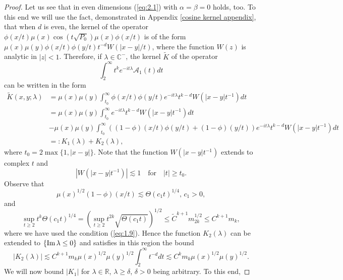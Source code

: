 \documentclass[11pt]{amsart}
\numberwithin{equation}{section}
\def\R{{\mathbb R}}
\begin{document}
\begin{proof}
Let us see that in even dimensions (\ref{eq:2.1}) with $\alpha=\beta=0$ holds, too. To this end we will use the fact, demonstrated in Appendix \ref{cosine kernel appendix}, that 
when $d$ is even,
the kernel of the operator
$\phi(x/t) \mu(x)\cos\left(t\sqrt{P_0}\right) \mu(x) \phi(x/t)$ is of the form $\mu(x) \mu(y)\phi(x/t)\phi(y/t)t^{-d}W(|x-y|/t)$, where the function $W(z)$ is analytic in $|z|<1$.
Therefore, if $\lambda\in\mathbb{C}^-$, the kernel $\widetilde K$ of the operator
\begin{equation*}
\int_2^\infty t^ke^{-it\lambda}\mathcal{A}_1(t)dt
\end{equation*}
can be written in the form 
\begin{equation*}
\begin{split}
\widetilde K(x,y;\lambda)&=\mu(x)\mu(y)\int_{t_0}^\infty \phi(x/t)\phi(y/t)e^{-it\lambda}t^{k-d}W(|x-y|t^{-1})dt\\
&=\mu(x)\mu(y)\int_{t_0}^\infty e^{-it\lambda}t^{k-d}W(|x-y|t^{-1})dt\\
&-\mu(x)\mu(y)\int_{t_0}^\infty ((1-\phi)(x/t)\phi(y/t)
+(1-\phi)(y/t))e^{-it\lambda}t^{k-d}W(|x-y|t^{-1})dt\\
&=: K_1(\lambda)+K_2(\lambda),
\end{split}
\end{equation*}
where $t_0 = 2\max\{1,|x-y|\}$. Note that the function $W(|x-y|t^{-1})$ extends to complex $t$ and 
\begin{equation*}
|W(|x-y|t^{-1})|\lesssim 1\quad\mbox{for}\quad|t|\ge t_0.
\end{equation*}
Observe that
\begin{equation*}
\mu(x)^{1/2}(1-\phi)(x/t)\lesssim \Theta(c_1t)^{1/4},\,c_1>0,
\end{equation*}
 and
\begin{equation*}
\sup_{t\ge 2}t^k\Theta(c_1t)^{1/4}=\left(\sup_{t\ge 2}t^{2k}\sqrt{\Theta(c_1t)}\right)^{1/2}
\le \widetilde C^{k+1}m_{2k}^{1/2}\le C^{k+1}m_k,
\end{equation*}
where we have used the condition (\ref{eq:1.9}).
 Hence 
the function $K_2(\lambda)$ can be extended to $\{{\rm Im}\,\lambda\le 0\}$ and satisfies in this region the bound
\begin{equation}\label{eq:2.5}
|K_2(\lambda)|\lesssim C^{k+1}m_k\mu(x)^{1/2}\mu(y)^{1/2}\int_2^\infty t^{-d}dt\lesssim 
C^{k}m_k\mu(x)^{1/2}\mu(y)^{1/2}.
\end{equation}
 We will now bound $|K_1|$ for $\lambda\in \R$, $\lambda\ge\delta$, $\delta>0$ being arbitrary. To this end, 

\end{proof}
\end{document}
